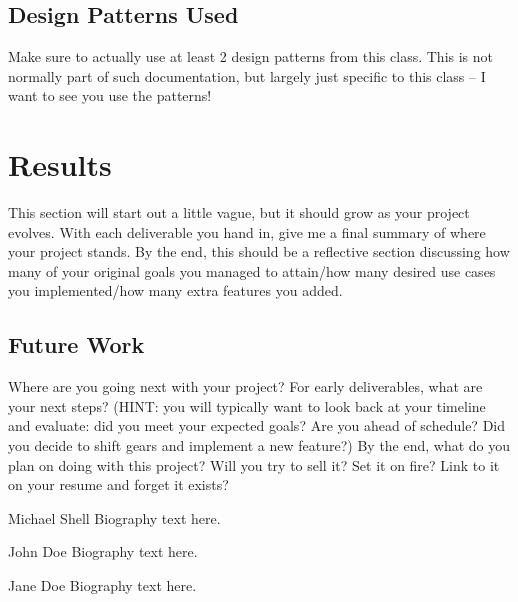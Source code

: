 \documentclass[10pt,conference,onecolumn,compsoc]{IEEEtran}
\begin{document}
\subsection{Design Patterns Used}
Make sure to actually use at least 2 design patterns from this class.  This is not normally part of such documentation, but largely just specific to this class -- I want to see you use the patterns!


\section{Results}
This section will start out a little vague, but it should grow as your project evolves.  With each deliverable you hand in, give me a final summary of where your project stands.  By the end, this should be a reflective section discussing how many of your original goals you managed to attain/how many desired use cases you implemented/how many extra features you added.

\subsection{Future Work}
Where are you going next with your project?
For early deliverables, what are your next steps?  (HINT: you will typically want to look back at your timeline and evaluate: did you meet your expected goals?  Are you ahead of schedule?  Did you decide to shift gears and implement a new feature?)
By the end, what do you plan on doing with this project?  Will you try to sell it?  Set it on fire?  Link to it on your resume and forget it exists?







\begin{IEEEbiography}{Michael Shell}
Biography text here.
\end{IEEEbiography}

\begin{IEEEbiographynophoto}{John Doe}
Biography text here.
\end{IEEEbiographynophoto}


\begin{IEEEbiographynophoto}{Jane Doe}
Biography text here.
\end{IEEEbiographynophoto}





\end{document}
